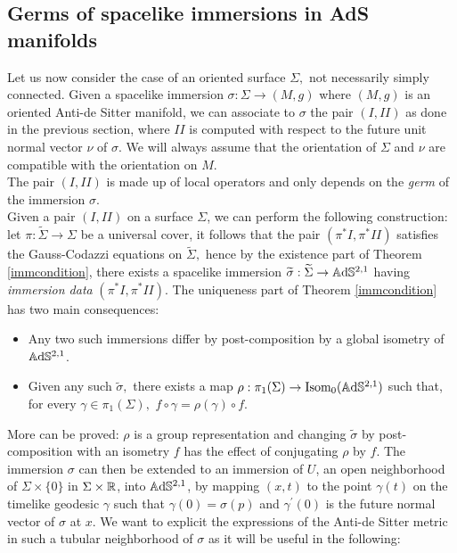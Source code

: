 \subsection{Germs of spacelike immersions in AdS manifolds}

Let us now consider the case of an oriented surface $\Sigma,$ not necessarily simply connected. Given a spacelike immersion $\sigma:\Sigma\to(M,g)$ where $(M,g)$ is an oriented Anti-de Sitter manifold, we can associate to $\sigma$ the pair $(I,II)$ as done in the previous section, where $II$ is computed with respect to the future unit normal vector $\nu$ of $\sigma$. We will always assume that the orientation of $\Sigma$ and $\nu$ are compatible with the orientation on $M.$\\
The pair $(I, II)$ is made up of local operators and only depends on the \textit{germ} of the immersion $\sigma.$\\
Given a pair $(I,II)$ on a surface $\Sigma$, we can perform the following construction: let $\pi:\widetilde{\Sigma}\to\Sigma$ be a universal cover, it follows that the pair $(\pi^*I,\pi^*II)$ satisfies the Gauss-Codazzi equations on $\widetilde{\Sigma},$ hence by the existence part of Theorem \ref{immcondition}, there exists a spacelike immersion $\widetilde{\sigma}:\widetilde{\Sigma}\to\mathbb{A}\mathrm{d}\mathbb{S}^{2,1}$ having \textit{immersion data} $(\pi^*I,\pi^*II)$. The uniqueness part of Theorem \ref{immcondition} has two main consequences: 

\begin{itemize}
    \item Any two such immersions differ by post-composition by a global isometry of $\mathbb{A}\mathrm{d}\mathbb{S}^{2,1}$. 
    \item Given any such $\widetilde{\sigma},$ there exists a map $\rho:\pi_1(\Sigma)\to\text{Isom}_0(\mathbb{A}\mathrm{d}\mathbb{S}^{2,1})$ such that, for every $\gamma\in\pi_1(\Sigma),$ $f\circ\gamma=\rho(\gamma)\circ f$. 
\end{itemize}

More can be proved: $\rho$ is a group representation and changing $\widetilde{\sigma}$ by post-composition with an isometry $f$ has the effect of conjugating $\rho$ by $f$. The immersion $\sigma$ can then be extended to an immersion of $U$, an open neighborhood of $\Sigma\times\{0\}$ in $\Sigma\times\mathbb{R}$, into $\mathbb{A}\mathrm{d}\mathbb{S}^{2,1}$, by mapping $(x,t)$ to the point $\gamma(t)$ on the timelike geodesic $\gamma$ such that $\gamma(0)=\sigma(p)$ and $\gamma^{\prime}(0)$ is the future normal vector of $\sigma$ at $x$. We want to explicit the expressions of the Anti-de Sitter metric in such a tubular neighborhood of $\sigma$ as it will be useful in the following: 

